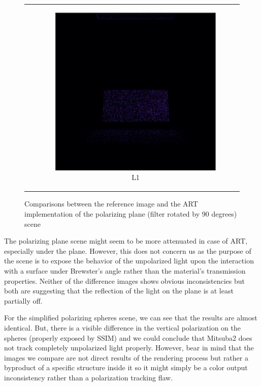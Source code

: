 \begin{figure}[h]
\begin{tabular}{cc}
\begin{subfigure}
			\caption{SSIM}
		\end{subfigure} 
		&
		\begin{subfigure}
			{0.4\textwidth}\centering\includegraphics[width=\linewidth]{img/polarizing_plane_90_L1.png}
			\caption{L1}
		\end{subfigure}
	\end{tabular}
	\caption{Comparisons between the reference image and the ART implementation of the polarizing plane (filter rotated by 90 degrees) scene}
	\label{fig:compare_polar_angle}
\end{figure}

The polarizing plane scene might seem to be more attenuated in case of ART, especially under the plane. However, this does not concern us as the purpose of the scene is to expose the behavior of the unpolarized light upon the interaction with a surface under Brewster's angle rather than the material's transmission properties. Neither of the difference images shows obvious inconsistencies but both are suggesting that the reflection of the light on the plane is at least partially off.

For the simplified polarizing spheres scene, we can see that the results are almost identical. But, there is  a visible difference in the vertical polarization on the spheres (properly exposed by SSIM) and we could conclude that Mitsuba2 does not track completely unpolarized light properly. However, bear in mind that the images we compare are not direct results of the rendering process but rather a byproduct of a specific structure inside it so it might simply be a color output inconsistency rather than a polarization tracking flaw.